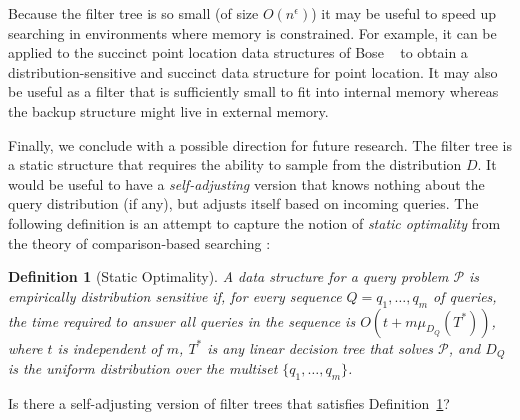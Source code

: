 \documentclass{patmorin}
\newtheorem{defn}{Definition}
\begin{document}
Because the filter tree is so small (of size $O(n^\epsilon)$) it
may be useful to speed up searching in environments where memory
is constrained. For example, it can be applied to the succinct
point location data structures of Bose \etal\ \cite{bchmm09} to obtain a
distribution-sensitive and succinct data structure for point location.
It may also be useful as a filter that is sufficiently small to fit
into internal memory whereas the backup structure might live in external
memory.

Finally, we conclude with a possible direction for future research.  The
filter tree is a static structure that requires the ability to sample from
the distribution $D$.  It would be useful to have a \emph{self-adjusting}
version that knows nothing about the query distribution (if any), but
adjusts itself based on incoming queries.   The following definition
is an attempt to capture the notion of \emph{static optimality} from the theory
of comparison-based searching \cite{st85}:

\begin{defn}[Static Optimality]\label{defn:static-optimality}
A data structure for a query problem $\mathcal{P}$ is \emph{empirically
distribution sensitive} if, for every sequence $Q=q_1,\ldots,q_m$
of queries, the time required to answer all queries in the sequence
is $O(t + m\mu_{D_Q}(T^*))$, where $t$ is independent of $m$, $T^*$
is any linear decision tree that solves $\mathcal{P}$, and $D_{Q}$
is the uniform distribution over the multiset $\{q_1,\ldots,q_m\}$.
\end{defn}
Is there a self-adjusting version of filter trees that satisfies
Definition~\ref{defn:static-optimality}?





\end{document}
